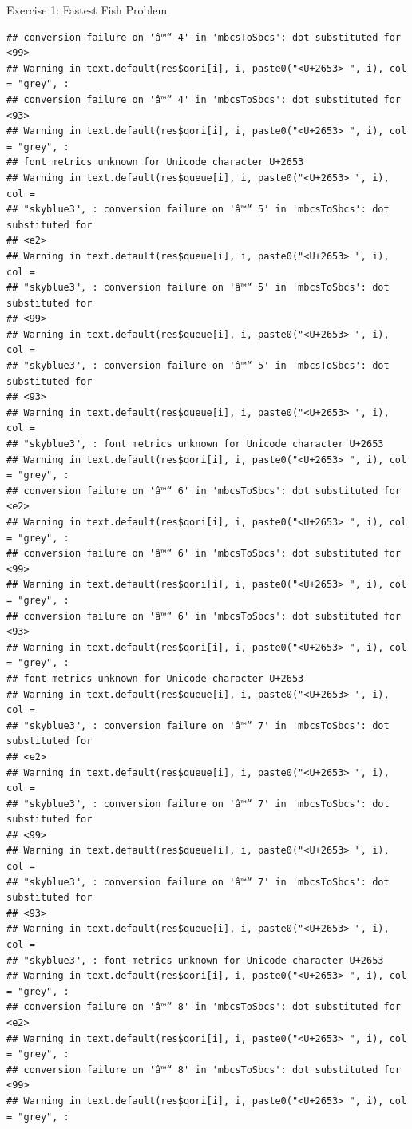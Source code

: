 \documentclass[
  10pt,
  ignorenonframetext,
  serif]{beamer}
\begin{document}
\begin{frame}[fragile]{Exercise 1: Fastest Fish Problem}
\begin{verbatim}
## conversion failure on 'â™“ 4' in 'mbcsToSbcs': dot substituted for <99>
## Warning in text.default(res$qori[i], i, paste0("<U+2653> ", i), col = "grey", :
## conversion failure on 'â™“ 4' in 'mbcsToSbcs': dot substituted for <93>
## Warning in text.default(res$qori[i], i, paste0("<U+2653> ", i), col = "grey", :
## font metrics unknown for Unicode character U+2653
## Warning in text.default(res$queue[i], i, paste0("<U+2653> ", i), col =
## "skyblue3", : conversion failure on 'â™“ 5' in 'mbcsToSbcs': dot substituted for
## <e2>
## Warning in text.default(res$queue[i], i, paste0("<U+2653> ", i), col =
## "skyblue3", : conversion failure on 'â™“ 5' in 'mbcsToSbcs': dot substituted for
## <99>
## Warning in text.default(res$queue[i], i, paste0("<U+2653> ", i), col =
## "skyblue3", : conversion failure on 'â™“ 5' in 'mbcsToSbcs': dot substituted for
## <93>
## Warning in text.default(res$queue[i], i, paste0("<U+2653> ", i), col =
## "skyblue3", : font metrics unknown for Unicode character U+2653
## Warning in text.default(res$qori[i], i, paste0("<U+2653> ", i), col = "grey", :
## conversion failure on 'â™“ 6' in 'mbcsToSbcs': dot substituted for <e2>
## Warning in text.default(res$qori[i], i, paste0("<U+2653> ", i), col = "grey", :
## conversion failure on 'â™“ 6' in 'mbcsToSbcs': dot substituted for <99>
## Warning in text.default(res$qori[i], i, paste0("<U+2653> ", i), col = "grey", :
## conversion failure on 'â™“ 6' in 'mbcsToSbcs': dot substituted for <93>
## Warning in text.default(res$qori[i], i, paste0("<U+2653> ", i), col = "grey", :
## font metrics unknown for Unicode character U+2653
## Warning in text.default(res$queue[i], i, paste0("<U+2653> ", i), col =
## "skyblue3", : conversion failure on 'â™“ 7' in 'mbcsToSbcs': dot substituted for
## <e2>
## Warning in text.default(res$queue[i], i, paste0("<U+2653> ", i), col =
## "skyblue3", : conversion failure on 'â™“ 7' in 'mbcsToSbcs': dot substituted for
## <99>
## Warning in text.default(res$queue[i], i, paste0("<U+2653> ", i), col =
## "skyblue3", : conversion failure on 'â™“ 7' in 'mbcsToSbcs': dot substituted for
## <93>
## Warning in text.default(res$queue[i], i, paste0("<U+2653> ", i), col =
## "skyblue3", : font metrics unknown for Unicode character U+2653
## Warning in text.default(res$qori[i], i, paste0("<U+2653> ", i), col = "grey", :
## conversion failure on 'â™“ 8' in 'mbcsToSbcs': dot substituted for <e2>
## Warning in text.default(res$qori[i], i, paste0("<U+2653> ", i), col = "grey", :
## conversion failure on 'â™“ 8' in 'mbcsToSbcs': dot substituted for <99>
## Warning in text.default(res$qori[i], i, paste0("<U+2653> ", i), col = "grey", :

\end{verbatim}
\end{frame}
\end{document}
